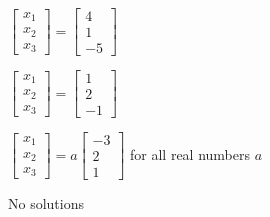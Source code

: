 \documentclass{article}
\begin{document}
\begin{readinessAssuranceTest}
  \begin{multicols}{2}
  \begin{readinessAssuranceTestChoices}
  \item \(
          \begin{bmatrix}
            x_1 \\ x_2 \\ x_3
          \end{bmatrix}=
          \begin{bmatrix}
            4 \\ 1 \\ -5
          \end{bmatrix}
        \)
  \item \(
          \begin{bmatrix}
            x_1 \\ x_2 \\ x_3
          \end{bmatrix}=
          \begin{bmatrix}
            1 \\ 2 \\ -1
          \end{bmatrix}
        \)
  \item \(
          \begin{bmatrix}
            x_1 \\ x_2 \\ x_3
          \end{bmatrix}=
          a
          \begin{bmatrix}
            -3 \\ 2 \\ 1
          \end{bmatrix}
        \) for all real numbers \(a\) %
  \item No solutions
  \end{readinessAssuranceTestChoices}
  \end{multicols}



\end{readinessAssuranceTest}
\end{document}
